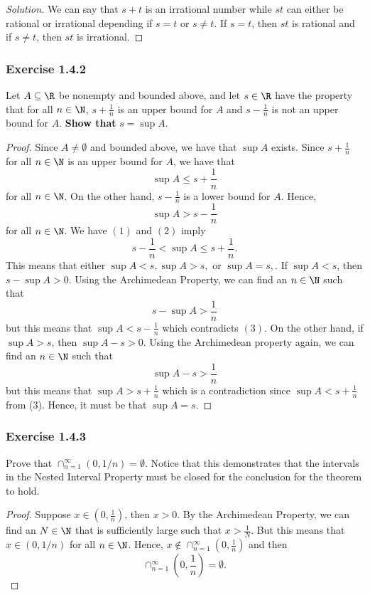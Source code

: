\begin{enumerate}
    
    \begin{proof}[Solution]
        We can say that \( s + t \) is an irrational number while \( st \) can either be rational or irrational depending if \( s = t \) or \( s \neq t \). If \( s = t \), then \( st \) is rational and if \( s \neq t \), then \( st \) is irrational. 
    \end{proof}
    
\end{enumerate}

\subsubsection{Exercise 1.4.2} 
    Let \( A \subseteq \R \) be nonempty and bounded above, and let \( s \in \R \) have the property that for all \( n \in \N \), \( s + \frac{1}{n} \) is an upper bound for \( A \) and \( s - \frac{1}{n} \) is not an upper bound for \( A \). \textbf{Show that } \( s = \sup A \).
        
    
    \begin{proof}
        Since \( A \neq \emptyset \) and bounded above, we have that \( \sup A \) exists. Since \( s + \frac{1}{n} \) for all \( n \in \N \) is an upper bound for \( A \), we have that 
        \[ \sup A \leq s + \frac{1}{n} \tag{1} \]
        for all \( n \in \N \). On the other hand, \( s - \frac{1}{n} \) is a lower bound for \( A \). Hence, 
        \[ \sup A > s - \frac{1}{n} \tag{2} \]
        for all \( n \in \N \). We have \( (1) \) and \( (2) \) imply 
        \[ s - \frac{1}{n} < \sup A \leq s + \frac{1}{n}. \tag{3} \]
        This means that either \( \sup A < s, \sup A > s, \) or \( \sup A = s, \). 
        If \( \sup A < s  \), then \( s - \sup A > 0 \). Using the Archimedean Property, we can find an \( n \in \N \) such that 
        \[ s - \sup A > \frac{1}{n}\]
        but this means that \( \sup  A < s - \frac{ 1}{n}\) which contradicts \( (3) \). On the other hand, if \( \sup A > s \), then \( \sup A - s > 0 \). Using the Archimedean property again, we can find an \( n \in \N \) such that 
        \[ \sup A - s > \frac{1}{n} \]
        but this means that \( \sup A > s + \frac{1}{n} \) which is a contradiction since \( \sup A < s + \frac{1}{n} \) from (3). Hence, it must be that \( \sup A = s \). 
    \end{proof}
    
\subsubsection{Exercise 1.4.3}
    Prove that \( \cap_{n=1}^{\infty} (0,1/n) = \emptyset \). Notice that this demonstrates that the intervals in the Nested Interval Property must be closed for the conclusion for the theorem to hold. 
    \begin{proof}
        Suppose \( x \in (0,\frac{1}{n}) \), then \( x > 0 \). By the Archimedean Property, we can find an \( N \in \N \) that is sufficiently large such that \( x > \frac{1}{N} \). But this means that \( x \in (0, 1/n )\) for all \( n \in \N  \). Hence, \( x \not\in \cap_{n=1}^{\infty} (0,\frac{1}{n})\) and then 
        \[ \cap_{n=1}^{\infty} (0,\frac{1}{n}) = \emptyset.\]
    \end{proof}
    
